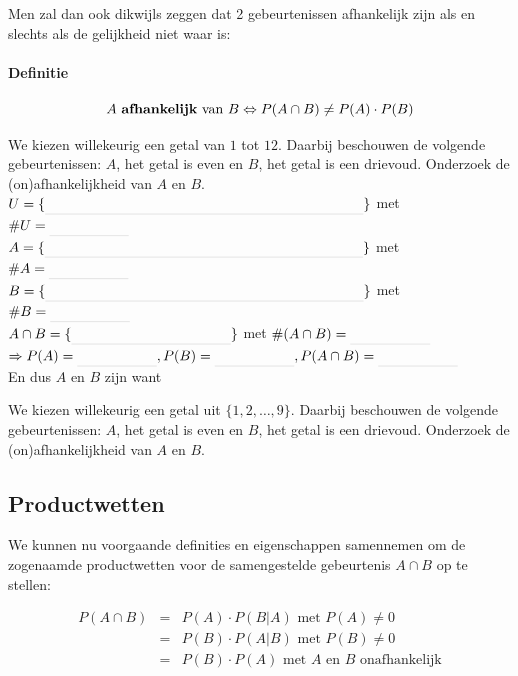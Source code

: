 \documentclass[12pt,twoside]{article}
\begin{document}
 Men zal dan ook dikwijls zeggen dat 2 gebeurtenissen afhankelijk zijn als en slechts als de gelijkheid niet waar is:

\paragraph*{Definitie}
\begin{mdframed}
$$A \mbox{ {\bf afhankelijk} van } B \Leftrightarrow P(A\cap B)\neq P(A)\cdot P(B)$$
\end{mdframed}

\begin{oefening} We kiezen willekeurig een getal van $1$ tot $12$. Daarbij beschouwen de volgende gebeurtenissen: $A$, het getal is even en $B$, het getal is een drievoud. Onderzoek de (on)afhankelijkheid van $A$ en $B$.\\
$U=\{\arule{8cm}\}$ met $\#U=\arule{2cm}$\\
$A=\{\arule{8cm}\}$ met $\#A=\arule{2cm}$\\
$B=\{\arule{8cm}\}$ met $\#B=\arule{2cm}$\\

$A\cap B=\{\arule{4cm}\}$ met $\#(A\cap B)=\arule{2cm}$\\

$\Rightarrow P(A)=\arule{2cm}, P(B)=\arule{2cm}, P(A\cap B)=\arule{2cm}$\\

En dus $A$ en $B$ zijn \arule{4cm} want \arule{4cm}
\end{oefening}

\begin{oefening}
We kiezen willekeurig een getal uit $\{1,2,\ldots, 9\}$. Daarbij beschouwen de volgende gebeurtenissen: $A$, het getal is even en $B$, het getal is een drievoud. Onderzoek de (on)afhankelijkheid van $A$ en $B$.
\end{oefening}

\subsection{Productwetten}

We kunnen nu voorgaande definities en eigenschappen samennemen om de zogenaamde productwetten voor de samengestelde gebeurtenis $A\cap B$ op te stellen:\\

\begin{mdframed}\vspace*{-0.5cm}
\begin{eqnarray*}
  P(A\cap B) &=& P(A)\cdot P(B|A) \mbox{ met } P(A)\neq 0\\
             &=& P(B)\cdot P(A|B) \mbox{ met } P(B)\neq 0\\
             &=& P(B)\cdot P(A) \mbox{ met $A$ en $B$ onafhankelijk}
\end{eqnarray*}
\end{mdframed}
\end{document}
